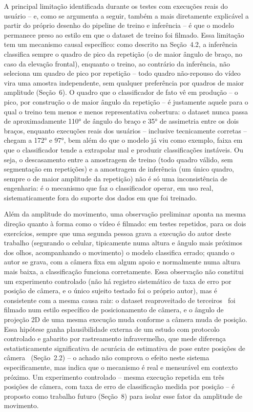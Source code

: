 \documentclass[12pt]{article}
\begin{document}
A principal limitação identificada durante os testes com execuções reais
do usuário -- e, como se argumenta a seguir, também a mais diretamente
explicável a partir do próprio desenho do pipeline de treino e inferência
-- é que o modelo permanece preso ao estilo em que o dataset de treino foi
filmado. Essa limitação tem um mecanismo causal específico: como descrito
na Seção~4.2, a inferência classifica sempre o quadro de pico da
repetição (o de maior ângulo de braço, no caso da elevação frontal),
enquanto o treino, ao contrário da inferência, não seleciona um quadro de
pico por repetição -- todo quadro não-repouso do vídeo vira uma amostra
independente, sem qualquer preferência por quadros de maior amplitude
(Seção~6). O quadro que o classificador de fato vê em produção -- o pico,
por construção o de maior ângulo da repetição -- é justamente aquele para
o qual o treino tem menos e menos representativa cobertura: o dataset
nunca passa de aproximadamente 110° de ângulo do braço e 35° de assimetria
entre os dois braços, enquanto execuções reais dos usuários -- inclusive
tecnicamente corretas -- chegam a 172° e 97°, bem além do que o modelo já
viu como exemplo, faixa em que o classificador tende a extrapolar mal e
produzir classificações instáveis. Ou seja, o descasamento entre a
amostragem de treino (todo quadro válido, sem segmentação em repetições) e
a amostragem de inferência (um único quadro, sempre o de maior amplitude
da repetição) não é só uma inconsistência de engenharia: é o mecanismo que
faz o classificador operar, em uso real, sistematicamente fora do suporte
dos dados em que foi treinado.

Além da amplitude do movimento, uma observação preliminar aponta na mesma
direção quanto à forma como o vídeo é filmado: em testes repetidos, para
os dois exercícios, sempre que uma segunda pessoa grava a execução do
autor deste trabalho (segurando o celular, tipicamente numa altura e
ângulo mais próximos dos olhos, acompanhando o movimento) o modelo
classifica errado; quando o autor se grava, com a câmera fixa em algum
apoio e normalmente numa altura mais baixa, a classificação funciona
corretamente. Essa observação não constitui um experimento controlado
(não há registro sistemático de taxa de erro por posição de câmera, e o
único sujeito testado foi o próprio autor), mas é consistente com a
mesma causa raiz: o dataset reaproveitado de
terceiros~\cite{chen2020posetrainerrepo} foi filmado num estilo específico
de posicionamento de câmera, e o ângulo de projeção 2D de uma mesma
execução muda conforme a câmera muda de posição. Essa hipótese ganha
plausibilidade externa de um estudo com protocolo controlado e gabarito
por rastreamento infravermelho, que mede diferença estatisticamente
significativa de acurácia de estimativa de pose entre posições de
câmera~\cite{aguilarortega2023uco} (Seção~2.2) -- o achado não comprova o
efeito neste sistema especificamente, mas indica que o mecanismo é real e
mensurável em contexto próximo. Um experimento
controlado -- mesma execução repetida em três posições de câmera, com taxa
de erro de classificação medida por posição -- é proposto como trabalho
futuro (Seção~8) para isolar esse fator da amplitude de movimento.
\end{document}
